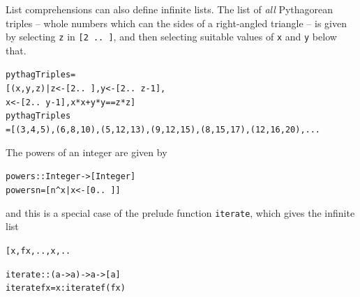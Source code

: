 List comprehensions can also define infinite lists. The list of {\em all\/}
Pythagorean triples -- whole numbers which can the sides of a right-angled triangle -- 
is given by selecting \texttt{z} in \texttt{[2 ..\ ]}, and
then selecting suitable values of \texttt{x} and \texttt{y} below that.
\begin{alltt}
pythagTriples =
  [ (x,y,z) | z <- [2 ..\ ] , y <- [2 ..\ z-1] , 
              x <- [2 ..\ y-1] , x*x + y*y == z*z ]
pythagTriples
= [(3,4,5),(6,8,10),(5,12,13),(9,12,15),(8,15,17),(12,16,20),...
\end{alltt}
The powers of an integer are given by
\begin{alltt}
powers :: Integer -> [Integer]
powers n = [ n\^{}x | x <- [0 ..\ ] ] 
\end{alltt}
and this is a special case of the prelude function \texttt{iterate}, which gives the
infinite list
\begin{alltt}
[ x , f x , .. ,  x , ..
\end{alltt}  
\begin{alltt}
iterate :: (a -> a) -> a -> [a]
iterate f x = x : iterate f (f x)
\end{alltt}

